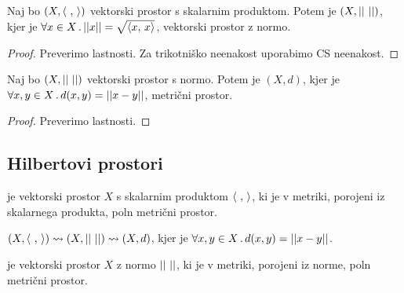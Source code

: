 \begin{trditev}
    Naj bo \((X, \left\langle \ , \,  \right\rangle)\) vektorski prostor s skalarnim produktom. Potem je \((X, ||\ ||)\), kjer je \(\forall x \in X \,.\, ||x|| = \sqrt{\left\langle x, \, x \right\rangle}\), vektorski prostor z normo.
\end{trditev}

\begin{proof}
    Preverimo lastnosti. Za trikotniško neenakost uporabimo CS neenakost.
\end{proof}

\begin{trditev}
    Naj bo \((X, ||\ ||)\) vektorski prostor s normo. Potem je \((X, d)\), kjer je \(\forall x, y \in X \,.\,d(x,y) = ||x - y||\), metrični prostor.
\end{trditev}

\begin{proof}
    Preverimo lastnosti. 
\end{proof}

\subsection{Hilbertovi prostori}
\begin{definicija}
     je vektorski prostor \(X\) s skalarnim produktom \(\left\langle \ , \,  \right\rangle\), ki je v metriki, porojeni iz skalarnega produkta, poln metrični prostor.
\end{definicija}

\begin{opomba}
    \((X, \left\langle \ , \,  \right\rangle) \leadsto (X, ||\ ||) \leadsto (X, d)\), kjer je \(\forall x, y \in X \,.\,d(x,y) = ||x - y||\).
\end{opomba}

\begin{opomba}
     je vektorski prostor \(X\) z normo \(||\ ||\), ki je v metriki, porojeni iz norme, poln metrični prostor.
\end{opomba}

